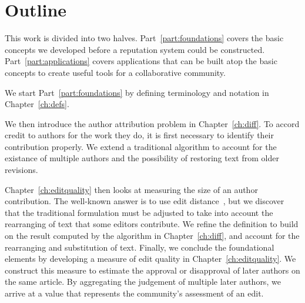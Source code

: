 \section{Outline}

This work is divided into two halves.
Part~\ref{part:foundations} covers the basic concepts we developed
before a reputation system could be constructed.
Part~\ref{part:applications} covers applications that can
be built atop the basic concepts to create useful tools for
a collaborative community.

We start Part~\ref{part:foundations}
by defining terminology and notation in Chapter~\ref{ch:defs}.

We then introduce the author attribution problem in Chapter~\ref{ch:diff}.
To accord credit to authors for the work they do,
it is first necessary to identify their contribution properly.
We extend a traditional  algorithm to
account for the existance of multiple authors and the possibility
of restoring text from older revisions.

Chapter~\ref{ch:editquality} then looks at measuring the size of
an author contribution.
The well-known answer is to use edit distance~\cite{Levenshtein1966},
but we discover that the traditional formulation must be adjusted
to take into account the rearranging of text that some editors contribute.
We refine the definition to build on the result computed by the
algorithm in Chapter~\ref{ch:diff}, and account for the rearranging
and substitution of text.
Finally, we conclude the foundational elements by developing a measure
of edit quality in Chapter~\ref{ch:editquality}.
We construct this measure to estimate the approval or disapproval of
later authors on the same article.
By aggregating the judgement of multiple later authors, we arrive at
a value that represents the community's assessment of an edit.



